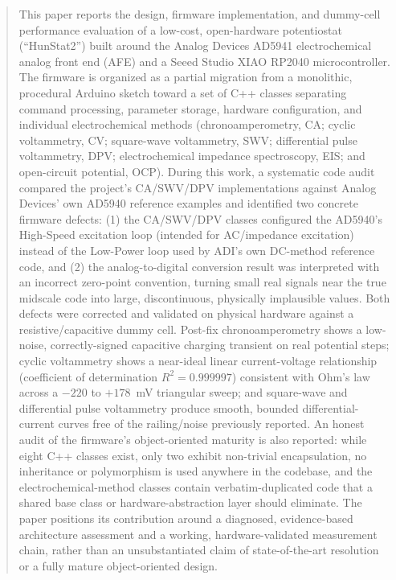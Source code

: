 \documentclass[journal]{IEEEtran}
\begin{document}
\begin{abstract}
This paper reports the design, firmware implementation, and dummy-cell performance evaluation of a low-cost, open-hardware potentiostat (``HunStat2'') built around the Analog Devices AD5941 electrochemical analog front end (AFE) and a Seeed Studio XIAO RP2040 microcontroller. The firmware is organized as a partial migration from a monolithic, procedural Arduino sketch toward a set of C++ classes separating command processing, parameter storage, hardware configuration, and individual electrochemical methods (chronoamperometry, CA; cyclic voltammetry, CV; square-wave voltammetry, SWV; differential pulse voltammetry, DPV; electrochemical impedance spectroscopy, EIS; and open-circuit potential, OCP). During this work, a systematic code audit compared the project's CA/SWV/DPV implementations against Analog Devices' own AD5940 reference examples and identified two concrete firmware defects: (1) the CA/SWV/DPV classes configured the AD5940's High-Speed excitation loop (intended for AC/impedance excitation) instead of the Low-Power loop used by ADI's own DC-method reference code, and (2) the analog-to-digital conversion result was interpreted with an incorrect zero-point convention, turning small real signals near the true midscale code into large, discontinuous, physically implausible values. Both defects were corrected and validated on physical hardware against a resistive/capacitive dummy cell. Post-fix chronoamperometry shows a low-noise, correctly-signed capacitive charging transient on real potential steps; cyclic voltammetry shows a near-ideal linear current-voltage relationship (coefficient of determination $R^2 = 0.999997$) consistent with Ohm's law across a $-220$ to $+178$~mV triangular sweep; and square-wave and differential pulse voltammetry produce smooth, bounded differential-current curves free of the railing/noise previously reported. An honest audit of the firmware's object-oriented maturity is also reported: while eight C++ classes exist, only two exhibit non-trivial encapsulation, no inheritance or polymorphism is used anywhere in the codebase, and the electrochemical-method classes contain verbatim-duplicated code that a shared base class or hardware-abstraction layer should eliminate. The paper positions its contribution around a diagnosed, evidence-based architecture assessment and a working, hardware-validated measurement chain, rather than an unsubstantiated claim of state-of-the-art resolution or a fully mature object-oriented design.
\end{abstract}
\end{document}
